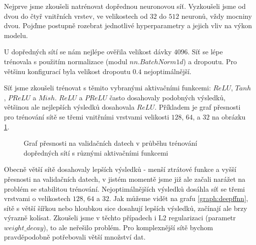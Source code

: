 Nejprve jsme zkoušeli natrénovat dopřednou neuronovou síť. Vyzkoušeli jsme od
dvou do čtyř vnitřních vrstev, ve velikostech od $32$ do $512$ neuronů, vždy
mocniny dvou. Pojďme postupně rozebrat jednotlivé hyperparametry a jejich vliv
na výkon modelu.

U dopředných sítí se nám nejlépe ověřila velikost dávky $4096$. Síť se lépe
trénovala s použitím normalizace (modul $nn.BatchNorm1d$) a dropoutu. Pro
většinu konfigurací byla velikost dropoutu $0.4$ nejoptimálnější.

Síť jsme zkoušeli trénovat s těmito vybranými aktivačními funkcemi: $ReLU$,
$Tanh$, $PReLU$ a $Mish$. $ReLU$ a $PReLU$ často dosahovaly podobných výsledků,
většinou ale nejlepších výsledků dosahovala $ReLU$. Příkladem je graf přesnosti
pro trénování sítě se třemi vnitřními vrstvami velikosti $128$, $64$, a $32$ na
obrázku \ref{graph:fnnactivations}.

\begin{figure}[]
    \centering
    \caption{Graf přesnosti na validačních datech v průběhu trénování dopředných sítí s různými aktivačními funkcemi}
    \label{graph:fnnactivations}
\end{figure}

Obecně větší sítě dosahovaly lepších výsledků - menší ztrátové funkce a vyšší
přesnosti na validačních datech, v jistém momentě jsme již ale začali narážet
na problém se stabilitou trénování. Nejoptimálnějších výsledků dosáhla síť se
třemi vrstvami o velikostech $128$, $64$ a $32$. Jak můžeme vidět na grafu
\ref{graph:deepffnn}, sítě s větší šířkou nebo hloubkou sice dosahují lepších
výsledků, začínají ale brzy výrazně kolísat. Zkoušeli jsme v těchto případech i
L2 regularizaci (parametr $weight\_decay$), to ale neřešilo problém. Pro
komplexnější sítě bychom pravděpodobně potřebovali větší množství dat.

